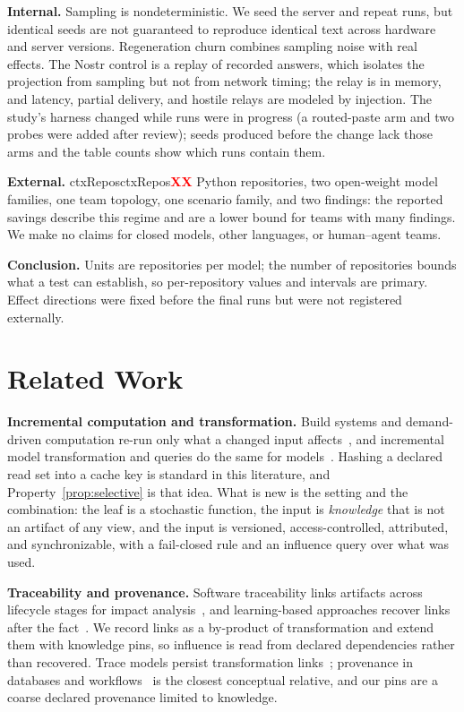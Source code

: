 \documentclass[10pt,conference]{IEEEtran}
\theoremstyle{definition}
\newcommand{\R}[1]{\ifcsname #1\endcsname\csname #1\endcsname\else\textcolor{red}{\textbf{XX}}\fi}
\begin{document}
\textbf{Internal.} Sampling is nondeterministic. We seed the server and repeat runs, but identical seeds are
not guaranteed to reproduce identical text across hardware and server versions. Regeneration churn combines
sampling noise with real effects. The Nostr control is a replay of recorded answers, which isolates the
projection from sampling but not from network timing; the relay is in memory, and latency, partial delivery,
and hostile relays are modeled by injection. The study's harness changed while runs were in progress
(a routed-paste arm and two probes were added after review); seeds produced before the change lack those
arms and the table counts show which runs contain them.

\textbf{External.} \R{ctxRepos} Python repositories, two open-weight model families, one team topology, one
scenario family, and two findings: the reported savings describe this regime and are a lower bound for teams
with many findings. We make no claims for closed models, other languages, or human--agent teams.

\textbf{Conclusion.} Units are repositories per model; the number of repositories bounds what a test can
establish, so per-repository values and intervals are primary. Effect directions were fixed before the final
runs but were not registered externally.

\section{Related Work}\label{sec:related}

\textbf{Incremental computation and transformation.} Build systems and demand-driven computation re-run only what
a changed input affects~\cite{mokhov2018build,hammer2014adapton,mitchell2012shake}, and incremental model
transformation and queries do the same for models~\cite{jouault2010incremental,ujhelyi2015incquery,giese2009sync}.
Hashing a declared read set into a cache key is standard in this literature, and
Property~\ref{prop:selective} is that idea. What is new is the setting and the combination: the leaf is a
stochastic function, the input is \emph{knowledge} that is not an artifact of any view, and the input is
versioned, access-controlled, attributed, and synchronizable, with a fail-closed rule and an influence query
over what was used.

\textbf{Traceability and provenance.} Software traceability links artifacts across lifecycle stages for impact
analysis~\cite{gotel1994traceability,cleland2014traceability}, and learning-based approaches recover links after
the fact~\cite{guo2017traceability}. We record links as a by-product of transformation and extend them with
knowledge pins, so influence is read from declared dependencies rather than recovered. Trace models persist
transformation links~\cite{jouault2005traceability,vara2014metagem}; provenance in databases and
workflows~\cite{buneman2001whywhere,moreau2013prov} is the closest conceptual relative, and our pins are a
coarse declared provenance limited to knowledge.
\end{document}
